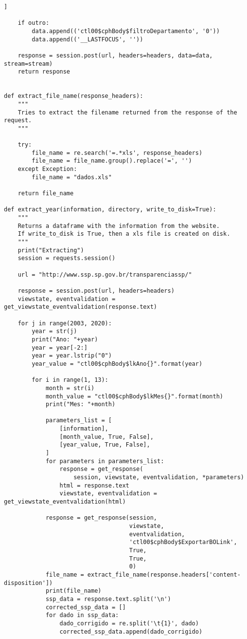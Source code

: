 \documentclass[
	12pt,
	openright,			%
	twoside,			%
	a4paper,			%
	chapter=TITLE,		%
	section=TITLE,		%
	subsection=TITLE,	%
	subsubsection=TITLE,%
	english,			%
	french,				%
	spanish,			%
	brazil				%
	]{abntex2}
\begin{document}
\begin{anexosenv}
\begin{lstlisting}[frame=single]
    ]

    if outro:
        data.append(('ctl00$cphBody$filtroDepartamento', '0'))
        data.append(('__LASTFOCUS', ''))

    response = session.post(url, headers=headers, data=data, stream=stream)
    return response


def extract_file_name(response_headers):
    """
    Tries to extract the filename returned from the response of the request.
    """

    try:
        file_name = re.search('=.*xls', response_headers)
        file_name = file_name.group().replace('=', '')
    except Exception:
        file_name = "dados.xls"

    return file_name

def extract_year(information, directory, write_to_disk=True):
    """
    Returns a dataframe with the information from the website.
    If write_to_disk is True, then a xls file is created on disk.
    """
    print("Extracting")
    session = requests.session()

    url = "http://www.ssp.sp.gov.br/transparenciassp/"

    response = session.post(url, headers=headers)
    viewstate, eventvalidation = get_viewstate_eventvalidation(response.text)

    for j in range(2003, 2020):
        year = str(j)
        print("Ano: "+year)
        year = year[-2:]
        year = year.lstrip("0")
        year_value = "ctl00$cphBody$lkAno{}".format(year)

        for i in range(1, 13):
            month = str(i)
            month_value = "ctl00$cphBody$lkMes{}".format(month)
            print("Mes: "+month)

            parameters_list = [
                [information],
                [month_value, True, False],
                [year_value, True, False],
            ]
            for parameters in parameters_list:
                response = get_response(
                    session, viewstate, eventvalidation, *parameters)
                html = response.text
                viewstate, eventvalidation = get_viewstate_eventvalidation(html)

            response = get_response(session,
                                    viewstate,
                                    eventvalidation,
                                    'ctl00$cphBody$ExportarBOLink',
                                    True,
                                    True,
                                    0)
            file_name = extract_file_name(response.headers['content-disposition'])
            print(file_name)
            ssp_data = response.text.split('\n')
            corrected_ssp_data = []
            for dado in ssp_data:
                dado_corrigido = re.split('\t{1}', dado)
                corrected_ssp_data.append(dado_corrigido)


\end{lstlisting}
\end{anexosenv}
\end{document}

